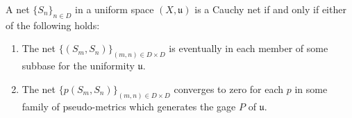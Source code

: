A net $\{S_n\}_{n \in D}$ in a uniform space $(X, \mathfrak{u})$ is a Cauchy net if and only if either of the following holds:
\begin{enumerate}
\item[(a)] The net $\{(S_m, S_n)\}_{(m,n) \in D \times D}$ is eventually in each member of some subbase for the uniformity $\mathfrak{u}$.
\item[(b)] The net $\{p(S_m, S_n)\}_{(m,n) \in D \times D}$ converges to zero for each $p$ in some family of pseudo-metrics which generates the gage $P$ of $\mathfrak{u}$.
\end{enumerate}

